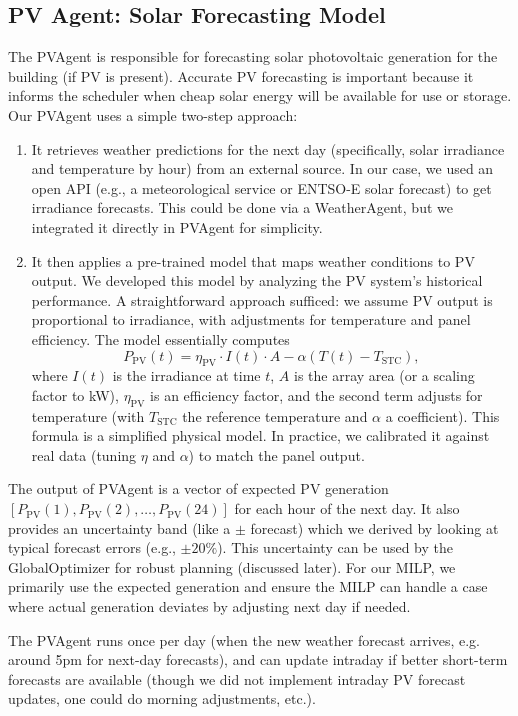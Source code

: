 \documentclass[12pt,a4paper]{article}
\begin{document}
\subsection{PV Agent: Solar Forecasting Model}
The PVAgent is responsible for forecasting solar photovoltaic generation for the building (if PV is present). Accurate PV forecasting is important because it informs the scheduler when cheap solar energy will be available for use or storage. Our PVAgent uses a simple two-step approach:
\begin{enumerate}
    \item It retrieves weather predictions for the next day (specifically, solar irradiance and temperature by hour) from an external source. In our case, we used an open API (e.g., a meteorological service or ENTSO-E solar forecast) to get irradiance forecasts. This could be done via a WeatherAgent, but we integrated it directly in PVAgent for simplicity.
    \item It then applies a pre-trained model that maps weather conditions to PV output. We developed this model by analyzing the PV system’s historical performance. A straightforward approach sufficed: we assume PV output is proportional to irradiance, with adjustments for temperature and panel efficiency. The model essentially computes 
    \[
        P_{\text{PV}}(t) = \eta_{\text{PV}} \cdot I(t) \cdot A - \alpha (T(t) - T_{\text{STC}}),
    \] 
    where $I(t)$ is the irradiance at time $t$, $A$ is the array area (or a scaling factor to kW), $\eta_{\text{PV}}$ is an efficiency factor, and the second term adjusts for temperature (with $T_{\text{STC}}$ the reference temperature and $\alpha$ a coefficient). This formula is a simplified physical model. In practice, we calibrated it against real data (tuning $\eta$ and $\alpha$) to match the panel output.
\end{enumerate}
The output of PVAgent is a vector of expected PV generation $[P_{\text{PV}}(1), P_{\text{PV}}(2), \dots, P_{\text{PV}}(24)]$ for each hour of the next day. It also provides an uncertainty band (like a $\pm$ forecast) which we derived by looking at typical forecast errors (e.g., $\pm20\%$). This uncertainty can be used by the GlobalOptimizer for robust planning (discussed later). For our MILP, we primarily use the expected generation and ensure the MILP can handle a case where actual generation deviates by adjusting next day if needed.

The PVAgent runs once per day (when the new weather forecast arrives, e.g. around 5pm for next-day forecasts), and can update intraday if better short-term forecasts are available (though we did not implement intraday PV forecast updates, one could do morning adjustments, etc.). 
\end{document}
